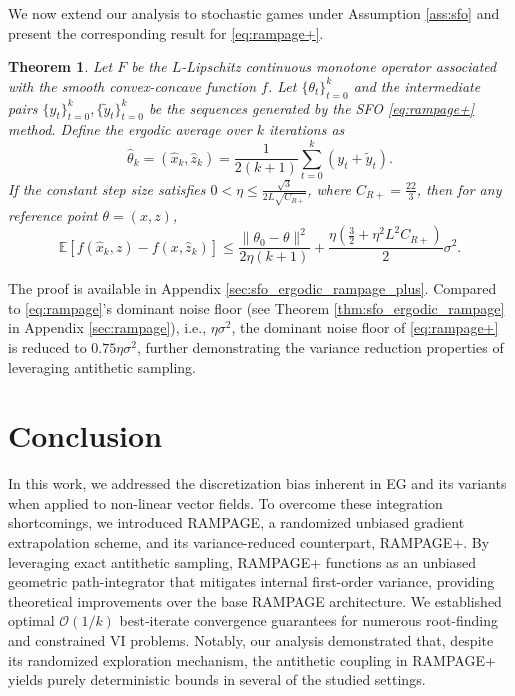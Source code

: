 \documentclass[letter,11pt]{article}
\newtheorem{theorem}{Theorem}[]
\begin{document}
We now extend our analysis to stochastic games under Assumption \ref{ass:sfo} and present the corresponding result for \eqref{eq:rampage+}.
\begin{theorem} \label{thm:sfo_ergodic_rampage_plus}
Let $F$ be the $L$-Lipschitz continuous monotone operator associated with the smooth convex-concave function $f$. Let $\{\theta_t\}_{t=0}^k$ and the intermediate pairs $\{y_t\}_{t=0}^k, \{\tilde{y}_t\}_{t=0}^k$ be the sequences generated by the SFO \eqref{eq:rampage+} method. Define the ergodic average over $k$ iterations as
\begin{equation} \label{eq:sfo_ramp_ergodic_def}
\hat{\theta}_k = (\hat{x}_k, \hat{z}_k) = \frac{1}{2(k+1)} \sum_{t=0}^k (y_t + \tilde{y}_t).
\end{equation}
If the constant step size satisfies $0 < \eta \le \frac{\sqrt{3}}{2L\sqrt{C_{R+}}}$, where $C_{R+} = \frac{22}{3}$, then for any reference point $\theta = (x, z)$,
\begin{equation}
\mathbb{E} \left[ f(\hat{x}_k, z) - f(x, \hat{z}_k) \right] \le \frac{\|\theta_0 - \theta\|^2}{2\eta (k+1)} + \frac{\eta \left( \frac{3}{2} + \eta^2 L^2 C_{R+} \right)}{2} \sigma^2.
\end{equation}
\end{theorem}
The proof is available in Appendix \ref{sec:sfo_ergodic_rampage_plus}. Compared to \eqref{eq:rampage}'s dominant noise floor (see Theorem \ref{thm:sfo_ergodic_rampage} in Appendix \ref{sec:rampage}), i.e., $\eta \sigma^2$, the dominant noise floor of \eqref{eq:rampage+} is reduced to $0.75\eta \sigma^2$, further demonstrating the variance reduction properties of leveraging antithetic sampling.
\section{Conclusion}
In this work, we addressed the discretization bias inherent in EG and its variants when applied to non-linear vector fields. To overcome these integration shortcomings, we introduced RAMPAGE, a randomized unbiased gradient extrapolation scheme, and its variance-reduced counterpart, RAMPAGE+. By leveraging exact antithetic sampling, RAMPAGE+ functions as an unbiased geometric path-integrator that mitigates internal first-order variance, providing theoretical improvements over the base RAMPAGE architecture. We established optimal $\mathcal{O}(1/k)$ best-iterate convergence guarantees for numerous root-finding and constrained VI problems. Notably, our analysis demonstrated that, despite its randomized exploration mechanism, the antithetic coupling in RAMPAGE+ yields purely deterministic bounds in several of the studied settings.


\newpage
\appendix
\end{document}
